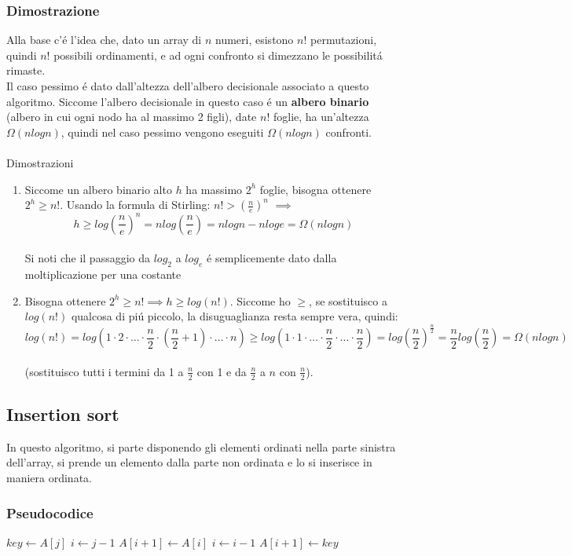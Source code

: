 \documentclass{article}
\begin{document}
\subsubsection{Dimostrazione}
Alla base c'é l'idea che, dato un array di $n$ numeri, esistono $n!$ permutazioni, quindi $n!$ possibili ordinamenti, e ad ogni confronto si dimezzano le possibilitá rimaste.\\
Il caso pessimo é dato dall'altezza dell'albero decisionale associato a questo algoritmo. Siccome l'albero decisionale in questo caso é un \textbf{albero binario} (albero in cui ogni nodo ha al massimo 2 figli), date $n!$ foglie, ha un'altezza $\Omega(nlogn)$, quindi nel caso pessimo vengono eseguiti $\Omega(nlogn)$ confronti.\\\\
Dimostrazioni
\begin{enumerate}
	\item Siccome un albero binario alto $h$ ha massimo $2^h$ foglie, bisogna ottenere $\displaystyle 2^h \ge n!$. Usando la formula di Stirling: $n! > (\frac{n}{e})^n$ $\implies$ $$h \ge log{(\frac{n}{e})^n} = nlog(\frac{n}{e}) = nlogn -nloge = \Omega(nlogn)$$\\
	Si noti che il passaggio da $log_2$ a $log_e$ é semplicemente dato dalla moltiplicazione per una costante
	\item Bisogna ottenere $2^h \ge n! \implies h \ge log(n!)$. Siccome ho $\ge$, se sostituisco a $log(n!)$ qualcosa di piú piccolo, la disuguaglianza resta sempre vera, quindi: $$\displaystyle log(n!) = log(1 \cdot 2 \cdot \dots \cdot \frac{n}{2} \cdot (\frac{n}{2}+1) \cdot \dots \cdot n) \ge log(1 \cdot 1 \cdot \dots \cdot \frac{n}{2} \cdot \dots \cdot \frac{n}{2}) = log(\frac{n}{2})^{\frac{n}{2}} = \frac{n}{2}log(\frac{n}{2}) = \Omega(nlogn)$$\\
	(sostituisco tutti i termini da 1 a $\frac{n}{2}$ con 1 e da $\frac{n}{2}$ a $n$ con $\frac{n}{2}$).
\end{enumerate}

\subsection{Insertion sort}
In questo algoritmo, si parte disponendo gli elementi ordinati nella parte sinistra dell'array, si prende un elemento dalla parte non ordinata e lo si inserisce in maniera ordinata.

\subsubsection{Pseudocodice}
\begin{algorithmic}
	\State $key \gets A[j]$
	\State $i \gets j - 1$	
	 
 		\State $A[i+1] \gets A[i]$ 
		\State $i \gets i - 1$
	\EndWhile
	\State $A[i+1] \gets key$
\EndFor
\end{algorithmic}
\end{document}
